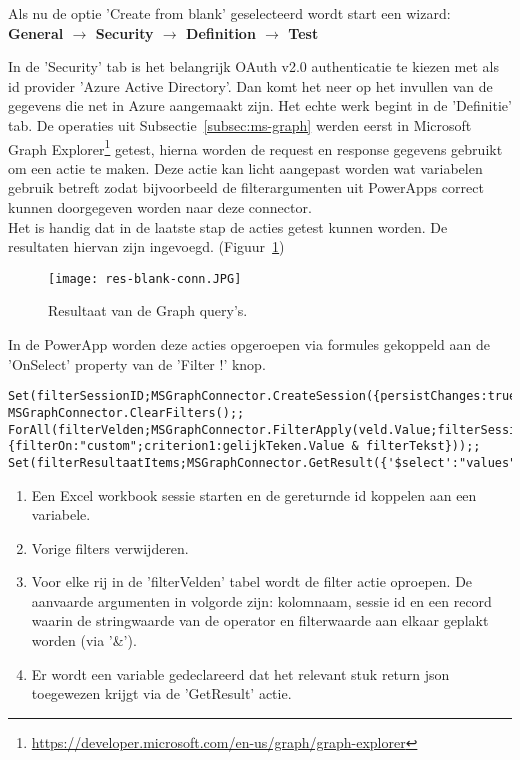 Als nu de optie 'Create from blank' geselecteerd wordt start een wizard:\\ 
\textbf{General $\rightarrow$ Security $\rightarrow$ Definition $\rightarrow$ Test}

In de 'Security' tab is het belangrijk OAuth v2.0 authenticatie te kiezen met als id provider 'Azure Active Directory'. Dan komt het neer op het invullen van de gegevens die net in Azure aangemaakt zijn. Het echte werk begint in de 'Definitie' tab. De operaties uit Subsectie~\ref{subsec:ms-graph} werden eerst in Microsoft Graph Explorer\footnote{\url{https://developer.microsoft.com/en-us/graph/graph-explorer}} getest, hierna worden de request en response gegevens gebruikt om een actie te maken. Deze actie kan licht aangepast worden wat variabelen gebruik betreft zodat bijvoorbeeld de filterargumenten uit PowerApps correct kunnen doorgegeven worden naar deze connector.\\
Het is handig dat in de laatste stap de acties getest kunnen worden. De resultaten hiervan zijn ingevoegd. (Figuur~\ref{fig:res-blank-conn})

\begin{figure}[h!]
    \centering
    \texttt{[image: res-blank-conn.JPG]}
    \caption{Resultaat van de Graph query's.}
    \label{fig:res-blank-conn}
\end{figure}

In de PowerApp worden deze acties opgeroepen via formules gekoppeld aan de 'OnSelect' property van de 'Filter !' knop.
\begin{lstlisting}
Set(filterSessionID;MSGraphConnector.CreateSession({persistChanges:true}).id);;
MSGraphConnector.ClearFilters();;
ForAll(filterVelden;MSGraphConnector.FilterApply(veld.Value;filterSessionID;{filterOn:"custom";criterion1:gelijkTeken.Value & filterTekst}));;
Set(filterResultaatItems;MSGraphConnector.GetResult({'$select':"values"}).value);;
\end{lstlisting}
\begin{enumerate}
    \item Een Excel workbook sessie starten en de gereturnde id koppelen aan een variabele.
    \item Vorige filters verwijderen.
    \item Voor elke rij in de 'filterVelden' tabel wordt de filter actie oproepen. De aanvaarde argumenten in volgorde zijn: kolomnaam, sessie id en een record waarin de stringwaarde van de operator en filterwaarde aan elkaar geplakt worden (via '\&').
    \item Er wordt een variable gedeclareerd dat het relevant stuk return json toegewezen krijgt via de 'GetResult' actie.
\end{enumerate}

